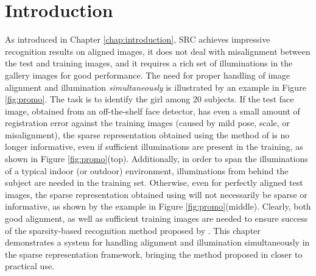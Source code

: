 \section{Introduction}
%

As introduced in Chapter \ref{chap:introduction}, SRC \cite{Wright2009-PAMI} 
achieves impressive recognition results on aligned images,
it does not deal with misalignment between the test and training
images, and it requires a rich set of illuminations in the gallery images for
good performance.  The need for proper handling of image alignment and
illumination {\em simultaneously} is illustrated by an example in Figure \ref{fig:promo}.  
The task is to
identify the girl among 20 subjects. If the test face image, obtained from
an off-the-shelf face detector, has even a small amount of registration error
against the training images (caused by mild pose, scale, or misalignment), the
sparse representation obtained using the method of \cite{Wright2009-PAMI} is no
longer informative, even if sufficient illuminations are present in the
training, as shown in Figure \ref{fig:promo}(top). Additionally, in order to
span the illuminations of a typical indoor (or outdoor) environment,
illuminations from behind the subject are needed in the training set.
Otherwise, even for perfectly aligned test images, the sparse representation
obtained using \cite{Wright2009-PAMI} will not necessarily be sparse or
informative, as shown by the example in Figure \ref{fig:promo}(middle).
Clearly, both good alignment, as well as sufficient training images are needed
to ensure success of the sparsity-based recognition method proposed by
\cite{Wright2009-PAMI}.  This chapter demonstrates a system for handling alignment
and illumination simultaneously in the sparse representation framework,
bringing the method proposed in \cite{Wright2009-PAMI} closer to practical use.

